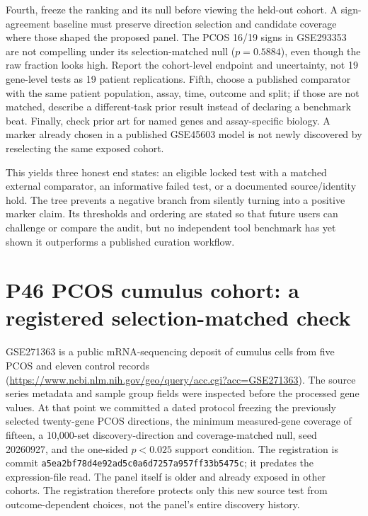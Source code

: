 \documentclass[11pt,a4paper]{article}
\begin{document}
Fourth, freeze the ranking and its null before viewing the held-out cohort. A sign-agreement baseline must preserve direction selection and candidate coverage where those shaped the proposed panel. The PCOS 16/19 signs in GSE293353 are not compelling under its selection-matched null ($p=0.5884$), even though the raw fraction looks high. Report the cohort-level endpoint and uncertainty, not 19 gene-level tests as 19 patient replications. Fifth, choose a published comparator with the same patient population, assay, time, outcome and split; if those are not matched, describe a different-task prior result instead of declaring a benchmark beat. Finally, check prior art for named genes and assay-specific biology. A marker already chosen in a published GSE45603 model is not newly discovered by reselecting the same exposed cohort.

This yields three honest end states: an eligible locked test with a matched external comparator, an informative failed test, or a documented source/identity hold. The tree prevents a negative branch from silently turning into a positive marker claim. Its thresholds and ordering are stated so that future users can challenge or compare the audit, but no independent tool benchmark has yet shown it outperforms a published curation workflow.


\section{P46 PCOS cumulus cohort: a registered selection-matched check}
GSE271363 is a public mRNA-sequencing deposit of cumulus cells from five PCOS and eleven control records (\url{https://www.ncbi.nlm.nih.gov/geo/query/acc.cgi?acc=GSE271363}). The source series metadata and sample group fields were inspected before the processed gene values. At that point we committed a dated protocol freezing the previously selected twenty-gene PCOS directions, the minimum measured-gene coverage of fifteen, a 10,000-set discovery-direction and coverage-matched null, seed 20260927, and the one-sided $p<0.025$ support condition. The registration is commit \texttt{a5ea2bf78d4e92ad5c0a6d7257a957ff33b5475c}; it predates the expression-file read. The panel itself is older and already exposed in other cohorts. The registration therefore protects only this new source test from outcome-dependent choices, not the panel's entire discovery history.
\end{document}

